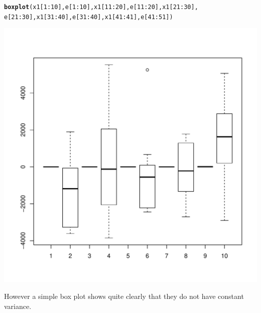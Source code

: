 \documentclass{article}\usepackage[]{graphicx}\usepackage[]{color}
\makeatletter
\def\maxwidth{ %
  \ifdim\Gin@nat@width>\linewidth
    \linewidth
  \else
    \Gin@nat@width
  \fi
}
\newcommand{\hlnum}[1]{\textcolor[rgb]{0.686,0.059,0.569}{#1}}%
\newcommand{\hlopt}[1]{\textcolor[rgb]{0,0,0}{#1}}%
\newcommand{\hlstd}[1]{\textcolor[rgb]{0.345,0.345,0.345}{#1}}%
\newcommand{\hlkwd}[1]{\textcolor[rgb]{0.737,0.353,0.396}{\textbf{#1}}}%
\newenvironment{kframe}{%
 \def\at@end@of@kframe{}%
 \ifinner\ifhmode%
  \def\at@end@of@kframe{\end{minipage}}%
  \begin{minipage}{\columnwidth}%
 \fi\fi%
 \def\FrameCommand##1{\hskip\@totalleftmargin \hskip-\fboxsep
 \colorbox{shadecolor}{##1}\hskip-\fboxsep
     \hskip-\linewidth \hskip-\@totalleftmargin \hskip\columnwidth}%
 \MakeFramed {\advance\hsize-\width
   \@totalleftmargin\z@ \linewidth\hsize
   \@setminipage}}%
 {\par\unskip\endMakeFramed%
 \at@end@of@kframe}
\newenvironment{knitrout}{}{} %
\makeatother
\begin{document}
\begin{knitrout}
\color{fgcolor}\begin{kframe}
\begin{alltt}
\hlkwd{boxplot}\hlstd{(x1[}\hlnum{1}\hlopt{:}\hlnum{10}\hlstd{],e[}\hlnum{1}\hlopt{:}\hlnum{10}\hlstd{],x1[}\hlnum{11}\hlopt{:}\hlnum{20}\hlstd{],e[}\hlnum{11}\hlopt{:}\hlnum{20}\hlstd{],x1[}\hlnum{21}\hlopt{:}\hlnum{30}\hlstd{],}
        \hlstd{e[}\hlnum{21}\hlopt{:}\hlnum{30}\hlstd{],x1[}\hlnum{31}\hlopt{:}\hlnum{40}\hlstd{],e[}\hlnum{31}\hlopt{:}\hlnum{40}\hlstd{],x1[}\hlnum{41}\hlopt{:}\hlnum{41}\hlstd{],e[}\hlnum{41}\hlopt{:}\hlnum{51}\hlstd{])}
\end{alltt}
\end{kframe}
\includegraphics[width=\maxwidth]{figure/unnamed-chunk-9-1} 

\end{knitrout}
However a simple box plot shows quite clearly that they do not have constant variance. 
\clearpage
\end{document}
